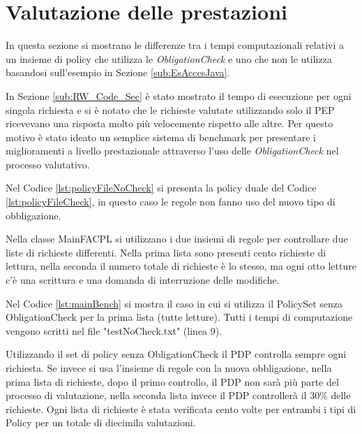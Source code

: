 \section{Valutazione delle prestazioni}
\label{sec:Valutazione delle prestazioni}
In questa sezione si mostrano le differenze tra i tempi computazionali relativi a un
insieme di policy che utilizza le \emph{ObligationCheck}
e uno che non le utilizza basandosi sull'esempio in Sezione \ref{sub:EsAccesJava}.\par
In Sezione \ref{sub:RW_Code_Sec} è stato mostrato il tempo di esecuzione per ogni singola richiesta e
si è notato che le richieste valutate utilizzando solo il \ac{PEP} ricevevano una risposta molto più velocemente rispetto
alle altre. Per questo motivo è stato ideato un semplice sistema di benchmark per presentare i miglioramenti a livello
prestazionale attraverso l'uso delle \emph{ObligationCheck} nel processo valutativo.\par
Nel Codice \ref{lst:policyFileNoCheck} si presenta la policy duale del Codice \ref{lst:policyFileCheck},
in questo caso le regole non fanno uso del nuovo tipo di obbligazione.

Nella classe MainFACPL si utilizzano i due insiemi di regole per controllare due liste di richieste differenti.
Nella prima lista sono presenti cento richieste di lettura, nella seconda il numero totale di richieste è lo stesso,
ma ogni otto letture c'è una scrittura e una domanda di interruzione delle modifiche.\par
Nel Codice \ref{lst:mainBench} si mostra il caso in cui si utilizza il PolicySet senza ObligationCheck per la prima lista
(tutte letture). Tutti i tempi di computazione vengono scritti nel file "testNoCheck.txt" (linea 9).\par
{}
Utilizzando il set di policy senza ObligationCheck il \ac{PDP} controlla sempre ogni richiesta. Se invece si usa l'insieme di regole
con la nuova obbligazione, nella prima lista di richieste, dopo il primo controllo, il \ac{PDP} non sarà più parte del processo
di valutazione, nella seconda lista invece il \ac{PDP} controllerà il 30\% delle richieste.
Ogni lista di richieste è stata verificata cento volte per entrambi i tipi di Policy per un totale di diecimila valutazioni.

